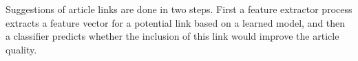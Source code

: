 






\subsubsection*{\subproblemtwo}
Suggestions of article links are done in two steps. First a feature extractor process extracts a feature vector for a potential link based on a learned model, and then a classifier predicts whether the inclusion of this link would improve the article quality.


